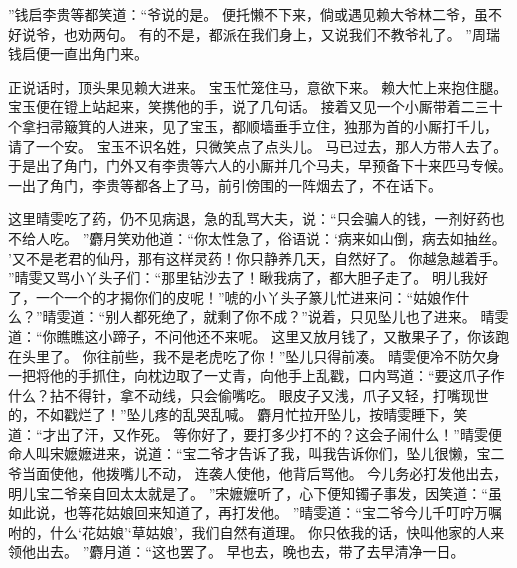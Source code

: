 ”钱启李贵等都笑道：“爷说的是。
便托懒不下来，倘或遇见赖大爷林二爷，虽不好说爷，也劝两句。
有的不是，都派在我们身上，又说我们不教爷礼了。
”周瑞钱启便一直出角门来。
\par
正说话时，顶头果见赖大进来。
宝玉忙笼住马，意欲下来。
赖大忙上来抱住腿。
宝玉便在镫上站起来，笑携他的手，说了几句话。
接着又见一个小厮带着二三十个拿扫帚簸箕的人进来，见了宝玉，都顺墙垂手立住，独那为首的小厮打千儿，
请了一个安。
宝玉不识名姓，只微笑点了点头儿。
马已过去，那人方带人去了。
于是出了角门，门外又有李贵等六人的小厮并几个马夫，早预备下十来匹马专候。
一出了角门，李贵等都各上了马，前引傍围的一阵烟去了，不在话下。
\par
这里晴雯吃了药，仍不见病退，急的乱骂大夫，说：“只会骗人的钱，一剂好药也不给人吃。
”麝月笑劝他道：“你太性急了，俗语说：‘病来如山倒，病去如抽丝。
’又不是老君的仙丹，那有这样灵药！你只静养几天，自然好了。
你越急越着手。
”晴雯又骂小丫头子们：“那里钻沙去了！瞅我病了，都大胆子走了。
明儿我好了，一个一个的才揭你们的皮呢！”唬的小丫头子篆儿忙进来问：“姑娘作什么？”晴雯道：“别人都死绝了，就剩了你不成？”说着，只见坠儿也\ceng 了进来。
晴雯道：“你瞧瞧这小蹄子，不问他还不来呢。
这里又放月钱了，又散果子了，你该跑在头里了。
你往前些，我不是老虎吃了你！”坠儿只得前凑。
晴雯便冷不防欠身一把将他的手抓住，向枕边取了一丈青，向他手上乱戳，口内骂道：“要这爪子作什么？拈不得针，拿不动线，只会偷嘴吃。
眼皮子又浅，爪子又轻，打嘴现世的，不如戳烂了！”坠儿疼的乱哭乱喊。
麝月忙拉开坠儿，按晴雯睡下，笑道：“才出了汗，又作死。
等你好了，要打多少打不的？这会子闹什么！”晴雯便命人叫宋嬷嬷进来，说道：“宝二爷才告诉了我，叫我告诉你们，坠儿很懒，宝二爷当面使他，他拨嘴儿不动，
连袭人使他，他背后骂他。
今儿务必打发他出去，明儿宝二爷亲自回太太就是了。
”宋嬷嬷听了，心下便知镯子事发，因笑道：“虽如此说，也等花姑娘回来知道了，再打发他。
”晴雯道：“宝二爷今儿千叮咛万嘱咐的，什么‘花姑娘’‘草姑娘’，我们自然有道理。
你只依我的话，快叫他家的人来领他出去。
”麝月道：“这也罢了。
早也去，晚也去，带了去早清净一日。
